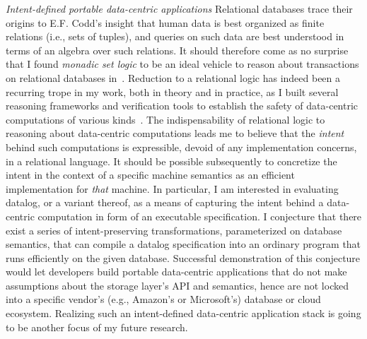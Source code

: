{\itshape\color{MidnightBlue}Intent-defined portable data-centric
applications} Relational databases trace their origins to E.F. Codd's
insight that human data is best organized as finite relations (i.e.,
sets of tuples), and queries on such data are best understood in terms
of an algebra over such relations. It should therefore come as no
surprise that I found \emph{monadic set logic} to be an ideal vehicle
to reason about transactions on relational databases in~\cite{popl18}.
Reduction to a relational logic has indeed been a recurring trope in
my work, both in theory and in practice, as I built several reasoning
frameworks and verification tools to establish the safety of
data-centric computations of various
kinds~\cite{icfp14,popl18,oopsla18,oopsla19}.  The indispensability of
relational logic to reasoning about data-centric computations leads me
to believe that the \emph{intent} behind such computations is
expressible, devoid of any implementation concerns, in a relational
language. It should be possible subsequently to concretize the intent
in the context of a specific machine semantics as an efficient
implementation for \emph{that} machine. In particular, I am interested
in evaluating datalog, or a variant thereof, as a means of capturing
the intent behind a data-centric computation in form of an executable
specification. I conjecture that there exist a series of
intent-preserving transformations, parameterized on database
semantics, that can compile a datalog specification into an ordinary
program that runs efficiently on the given database. Successful
demonstration of this conjecture would let developers build portable
data-centric applications that do not make assumptions about the
storage layer's API and semantics, hence are not locked into a
specific vendor's (e.g., Amazon's or Microsoft's) database or cloud
ecosystem. Realizing such an intent-defined data-centric application
stack is going to be another focus of my future research.

